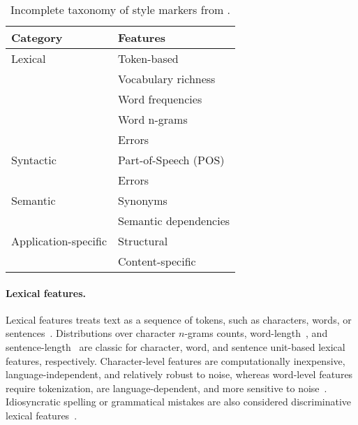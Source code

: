 \begin{table}[]
    \centering
    \caption{Incomplete taxonomy of style markers from \citep{stamatatos_survey_2009}.}
    \label{tab:stylometric_features}
 
    \begin{tabular}{@{}ll@{}} %
    \toprule
    \textbf{Category} & \textbf{Features} \\ 
    \midrule
    Lexical & Token-based \\ %
     & Vocabulary richness  \\
     & Word frequencies  \\
     & Word n-grams  \\
     & Errors \\
    Syntactic & Part-of-Speech (POS)  \\
     & Errors  \\
    Semantic & Synonyms \\
     & Semantic dependencies \\
    Application-specific & Structural  \\
     & Content-specific\\
     \bottomrule
    \end{tabular}%

\end{table}

\paragraph{Lexical features.} 
Lexical features treats text as a sequence of tokens, such as characters, words, or sentences~\citep{stamatatos_survey_2009}. 
Distributions over character $n$-grams counts, word-length~\citep{stein_intrinsic_2011}, and sentence-length~\citep{stein_intrinsic_2011,abbasi_writeprints_2008} are classic for character, word, and sentence unit-based lexical features, respectively. 
Character-level features are computationally inexpensive, language-independent, and relatively robust to noise, whereas word-level features require tokenization, are language-dependent, and more sensitive to noise~\citep{stamatatos_survey_2009}.
Idiosyncratic spelling or grammatical mistakes are also considered discriminative lexical features~\citep{abbasi_writeprints_2008,neal_surveying_2018}. 


